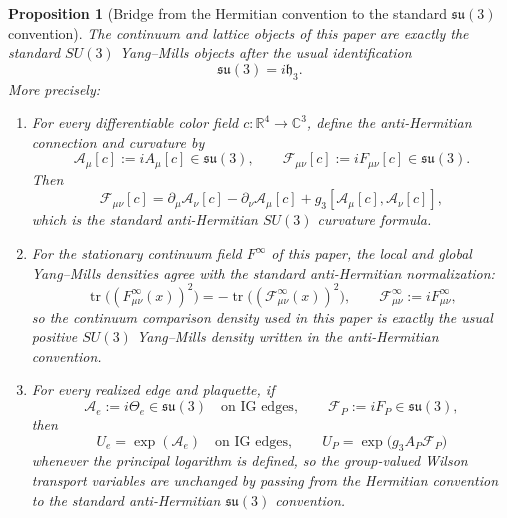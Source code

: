 \documentclass[11pt]{article}
\newtheorem{proposition}[theorem]{Proposition}
\theoremstyle{definition}
\theoremstyle{remark}
\newcommand{\R}{\mathbb R}
\newcommand{\C}{\mathbb C}
\newcommand{\tr}{\operatorname{tr}}
\newcommand{\fraksu}{\mathfrak{su}(3)}
\newcommand{\mathfrakh}{\mathfrak h_3}
\begin{document}
\begin{proposition}[Bridge from the Hermitian convention to the standard
\(\mathfrak{su}(3)\) convention]
\label{prop:su3-convention-bridge}
The continuum and lattice objects of this paper are exactly the standard
\(SU(3)\) Yang--Mills objects after the usual identification
\[
\fraksu=i\mathfrakh.
\]
More precisely:
\begin{enumerate}[leftmargin=1.5em,label=\textnormal{(\roman*)}]
\item For every differentiable color field \(c:\R^4\to\C^3\), define the
anti-Hermitian connection and curvature by
\[
\mathcal A_\mu[c]:=iA_\mu[c]\in\fraksu,
\qquad
\mathcal F_{\mu\nu}[c]:=iF_{\mu\nu}[c]\in\fraksu.
\]
Then
\[
\mathcal F_{\mu\nu}[c]
=
\partial_\mu\mathcal A_\nu[c]-\partial_\nu\mathcal A_\mu[c]
+g_3[\mathcal A_\mu[c],\mathcal A_\nu[c]],
\]
which is the standard anti-Hermitian \(SU(3)\) curvature formula.
\item For the stationary continuum field \(F^\infty\) of this paper, the local
and global Yang--Mills densities agree with the standard anti-Hermitian
normalization:
\[
\tr\!\bigl((F_{\mu\nu}^\infty(x))^2\bigr)
=
-\tr\!\bigl((\mathcal F_{\mu\nu}^\infty(x))^2\bigr),
\qquad
\mathcal F_{\mu\nu}^\infty:=iF_{\mu\nu}^\infty,
\]
so the continuum comparison density used in this paper is exactly the usual
positive \(SU(3)\) Yang--Mills density written in the anti-Hermitian
convention.
\item For every realized edge and plaquette, if
\[
\mathcal A_e:=i\Theta_e\in\fraksu
\quad\text{on IG edges},\qquad
\mathcal F_P:=iF_P\in\fraksu,
\]
then
\[
U_e=\exp(\mathcal A_e)
\quad\text{on IG edges},\qquad
U_P=\exp\!\bigl(g_3A_P\mathcal F_P\bigr)
\]
whenever the principal logarithm is defined, so the group-valued Wilson
transport variables are unchanged by passing from the Hermitian convention to
the standard anti-Hermitian \(\fraksu\) convention.
\end{enumerate}
\end{proposition}
\end{document}
